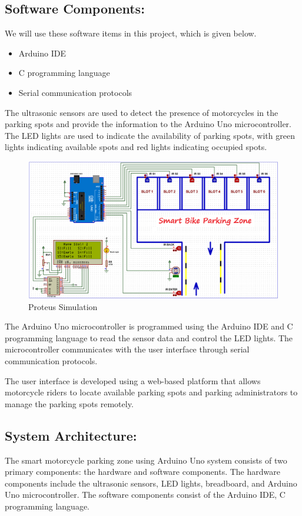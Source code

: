 \documentclass[conference]{IEEEtran}
\begin{document}
	\subsection{Software Components:} 
		We will use these software items in this project, which is given below.
	
	\begin{itemize}
		\item Arduino IDE
		\item C programming language
		\item Serial communication protocols
	\end{itemize}

The ultrasonic sensors are used to detect the presence of motorcycles in the parking spots and provide the information to the Arduino Uno microcontroller. The LED lights are used to indicate the availability of parking spots, with green lights indicating available spots and red lights indicating occupied spots.
\begin{figure}[htbp]
	\centerline{\includegraphics[scale=0.25]{Proteus Simulation.png}}
	\caption{Proteus Simulation}
	\label{fig}
\end{figure}

The Arduino Uno microcontroller is programmed using the Arduino IDE and C programming language to read the sensor data and control the LED lights. The microcontroller communicates with the user interface through serial communication protocols.

The user interface is developed using a web-based platform that allows motorcycle riders to locate available parking spots and parking administrators to manage the parking spots remotely.
	\subsection{System Architecture:}
	The smart motorcycle parking zone using Arduino Uno system consists of two primary components: the hardware and software components. The hardware components include the ultrasonic sensors, LED lights, breadboard, and Arduino Uno microcontroller. The software components consist of the Arduino IDE, C programming language.\cite{b7}
\end{document}
